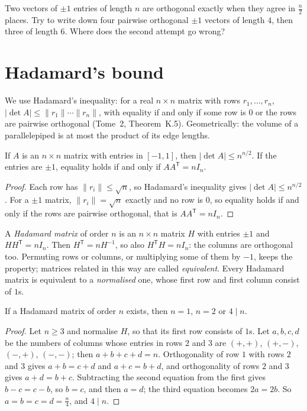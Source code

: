 \begin{think}
Two vectors of $\pm1$ entries of length $n$ are orthogonal exactly when they agree in $\frac n2$ places. Try to write down four pairwise orthogonal
$\pm1$ vectors of length $4$, then three of length $6$. Where does the second attempt go wrong?
\end{think}

\section{Hadamard's bound}

We use Hadamard's inequality: for a real $n\times n$ matrix with rows $r_1,\dots,r_n$, $|\det A|\le\|r_1\|\cdots\|r_n\|$, with equality if and only if
some row is $0$ or the rows are pairwise orthogonal (Tome~2, Theorem~K.5). Geometrically: the volume of a parallelepiped is at most the product of its
edge lengths.

\begin{theorem}[Hadamard, 1893]\label{conjectures:thm:hadbound}
If $A$ is an $n\times n$ matrix with entries in $[-1,1]$, then $|\det A|\le n^{n/2}$. If the entries are $\pm1$, equality holds if and only if
$AA^{\mathsf T}=nI_n$.
\end{theorem}
\begin{proof}
Each row has $\|r_i\|\le\sqrt n$, so Hadamard's inequality gives $|\det A|\le n^{n/2}$. For a $\pm1$ matrix, $\|r_i\|=\sqrt n$ exactly and no row is $0$,
so equality holds if and only if the rows are pairwise orthogonal, that is $AA^{\mathsf T}=nI_n$.
\end{proof}

A \emph{Hadamard matrix} of order $n$ is an $n\times n$ matrix $H$ with entries $\pm1$ and $HH^{\mathsf T}=nI_n$. Then $H^{\mathsf T}=nH^{-1}$, so also
$H^{\mathsf T}H=nI_n$: the columns are orthogonal too. Permuting rows or columns, or multiplying some of them by $-1$, keeps the property; matrices related
in this way are called \emph{equivalent}. Every Hadamard matrix is equivalent to a \emph{normalised} one, whose first row and first column consist of $1$s.

\begin{proposition}\label{conjectures:prop:div4}
If a Hadamard matrix of order $n$ exists, then $n=1$, $n=2$ or $4\mid n$.
\end{proposition}
\begin{proof}
Let $n\ge3$ and normalise $H$, so that its first row consists of $1$s. Let $a,b,c,d$ be the numbers of columns whose entries in rows $2$ and $3$ are
$(+,+)$, $(+,-)$, $(-,+)$, $(-,-)$; then $a+b+c+d=n$. Orthogonality of row $1$ with rows $2$ and $3$ gives $a+b=c+d$ and $a+c=b+d$, and orthogonality
of rows $2$ and $3$ gives $a+d=b+c$. Subtracting the second equation from the first gives $b-c=c-b$, so $b=c$, and then $a=d$; the third equation
becomes $2a=2b$. So $a=b=c=d=\frac n4$, and $4\mid n$.
\end{proof}

